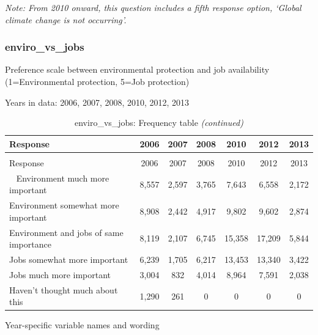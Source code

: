 \documentclass[12pt]{article}
\begin{document}
\emph{Note: From 2010 onward, this question includes a fifth response
option, `Global climate change is not occurring'.}

\subsubsection{enviro\_vs\_jobs}\label{enviro_vs_jobs}

Preference scale between environmental protection and job availability
(1=Environmental protection, 5=Job protection)

Years in data: 2006, 2007, 2008, 2010, 2012,
2013\begingroup\fontsize{10}{12}\selectfont

\begin{longtable}[t]{lcccccc}
\caption{\label{tab:unnamed-chunk-4}enviro\_vs\_jobs: Frequency table}\\
\toprule
Response & 2006 & 2007 & 2008 & 2010 & 2012 & 2013\\
\midrule
\endfirsthead
\caption[]{enviro\_vs\_jobs: Frequency table \textit{(continued)}}\\
\toprule
Response & 2006 & 2007 & 2008 & 2010 & 2012 & 2013\\
\midrule
\endhead
\
\endfoot
\bottomrule
\endlastfoot
Environment much more important & 8,557 & 2,597 & 3,765 & 7,643 & 6,558 & 2,172\\
Environment somewhat more important & 8,908 & 2,442 & 4,917 & 9,802 & 9,602 & 2,874\\
Environment and jobs of same importance & 8,119 & 2,107 & 6,745 & 15,358 & 17,209 & 5,844\\
Jobs somewhat more important & 6,239 & 1,705 & 6,217 & 13,453 & 13,340 & 3,422\\
Jobs much more important & 3,004 & 832 & 4,014 & 8,964 & 7,591 & 2,038\\
Haven't thought much about this & 1,290 & 261 & 0 & 0 & 0 & 0\\*
\end{longtable}

\endgroup{}

Year-specific variable names and wording
\end{document}
